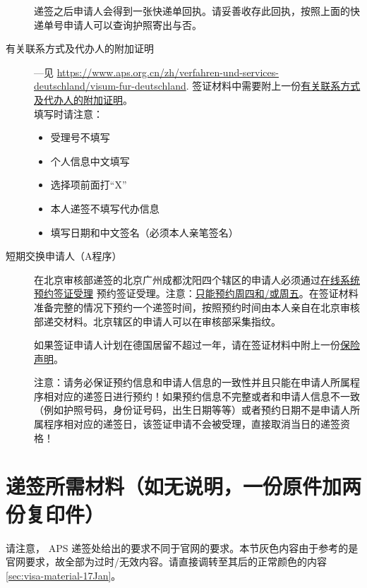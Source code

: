 \documentclass[oneside,final]{book}
\begin{document}
\begin{description}
递签之后申请人会得到一张快递单回执。请妥善收存此回执，按照上面的快递单号申请人可以查询护照寄出与否。
\item[有关联系方式及代办人的附加证明\label{inline-additional-proof}] ---见 \url{https://www.aps.org.cn/zh/verfahren-und-services-deutschland/visum-fur-deutschland}.
签证材料中需要附上一份\href{https://china.diplo.de/blob/1341728/895a5533a3c35c4fd2fbc21e92d6dfa3/pdf-formular-zusatzerklaerung-erreichbarkeit-data.pdf}{有关联系方式及代办人的附加证明}。\\
填写时请注意：
\begin{itemize}
  \item 受理号不填写
  \item 个人信息中文填写
  \item 选择项前面打“X”
  \item 本人递签不填写代办信息
  \item 填写日期和中文签名（必须本人亲笔签名）
\end{itemize}
\item[短期交换申请人（A程序）]
在北京审核部递签的北京广州成都沈阳四个辖区的申请人必须通过\href{https://service2.diplo.de/rktermin/extern/choose_category.do?locationCode=peki&realmId=12&categoryId=156&request_locale=de}{在线系统预约签证受理} 预约签证受理。注意：\underline{只能预约周四和/或周五}。在签证材料准备完整的情况下预约一个递签时间，按照预约时间由本人亲自在北京审核部递交材料。北京辖区的申请人可以在审核部采集指纹。

如果签证申请人计划在德国居留不超过一年，请在签证材料中附上一份\href{https://www.aps.org.cn/wp-content/uploads/Belehrung_KV.pdf}{保险声明}。

注意：请务必保证预约信息和申请人信息的一致性并且只能在申请人所属程序相对应的递签日进行预约！如果预约信息不完整或者和申请人信息不一致（例如护照号码，身份证号码，出生日期等等）或者预约日期不是申请人所属程序相对应的递签日，该签证申请不会被受理，直接取消当日的递签资格！
\end{description}


\section{递签所需材料（如无说明，一份原件加两份复印件）}\label{sec:visa-material}
请注意， APS 递签处给出的要求不同于官网的要求。本节灰色内容由于参考的是官网要求，故全部为过时/无效内容。请直接调转至其后的正常颜色的内容 \ref{sec:visa-material-17Jan}。
\end{document}
